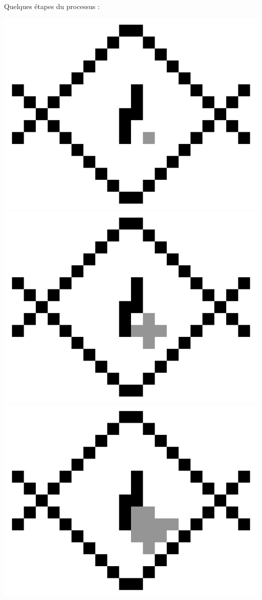 \documentclass[11pt,class=report,crop=false]{standalone}
\begin{document}
Quelques étapes du processus :	
\begin{center}
	\includegraphics[scale=\myscale,scale=0.15]{figures/fill01_000}\quad
	\includegraphics[scale=\myscale,scale=0.15]{figures/fill01_004}\quad
	\includegraphics[scale=\myscale,scale=0.15]{figures/fill01_015}\quad

\end{center}
\end{document}
